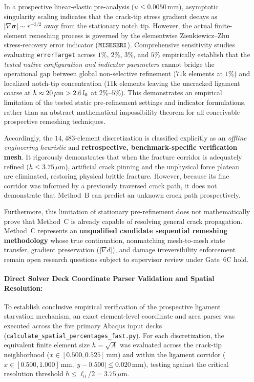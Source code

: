 In a prospective linear-elastic pre-analysis ($u \le 0.0050\,\mathrm{mm}$), asymptotic singularity scaling indicates that the crack-tip stress gradient decays as $|\nabla \boldsymbol{\sigma}| \sim r^{-3/2}$ away from the stationary notch tip. However, the actual finite-element remeshing process is governed by the elementwise Zienkiewicz--Zhu stress-recovery error indicator ($\texttt{MISESERI}$). Comprehensive sensitivity studies evaluating \texttt{errorTarget} across $1\%$, $2\%$, $3\%$, and $5\%$ empirically establish that the \emph{tested native configuration and indicator parameters} cannot bridge the operational gap between global non-selective refinement ($71\mathrm{k}$ elements at $1\%$) and localized notch-tip concentration ($11\mathrm{k}$ elements leaving the uncracked ligament coarse at $h \approx 20\,\mu\mathrm{m} > 2.6\,l_0$ at $2\%$--$5\%$). This demonstrates an empirical limitation of the tested static pre-refinement settings and indicator formulations, rather than an abstract mathematical impossibility theorem for all conceivable prospective remeshing techniques.

Accordingly, the $14{,}483$-element discretization is classified explicitly as an \emph{offline engineering heuristic} and \textbf{retrospective, benchmark-specific verification mesh}. It rigorously demonstrates that when the fracture corridor is adequately refined ($h \le 3.75\,\mu\mathrm{m}$), artificial crack pinning and the unphysical force plateau are eliminated, restoring physical brittle fracture. However, because its fine corridor was informed by a previously traversed crack path, it does not demonstrate that Method~B can predict an unknown crack path prospectively. 

Furthermore, this limitation of stationary pre-refinement does not mathematically prove that Method~C is already capable of resolving general crack propagation. Method~C represents an \textbf{unqualified candidate sequential remeshing methodology} whose true continuation, nonmatching mesh-to-mesh state transfer, gradient preservation ($|\nabla d|$), and damage irreversibility enforcement remain open research questions subject to supervisor review under Gate~6C hold.

\paragraph{Direct Solver Deck Coordinate Parser Validation and Spatial Resolution:}
To establish conclusive empirical verification of the prospective ligament starvation mechanism, an exact element-level coordinate and area parser was executed across the five primary Abaqus input decks (\texttt{calculate\_spatial\_percentages\_fast.py}). For each discretization, the equivalent finite element size $h = \sqrt{A}$ was evaluated across the crack-tip neighborhood ($x \in [0.500, 0.525]\,\mathrm{mm}$) and within the ligament corridor ($x \in [0.500, 1.000]\,\mathrm{mm}, |y - 0.500| \le 0.020\,\mathrm{mm}$), testing against the critical resolution threshold $h \le \ell_0/2 = 3.75\,\mu\mathrm{m}$.

